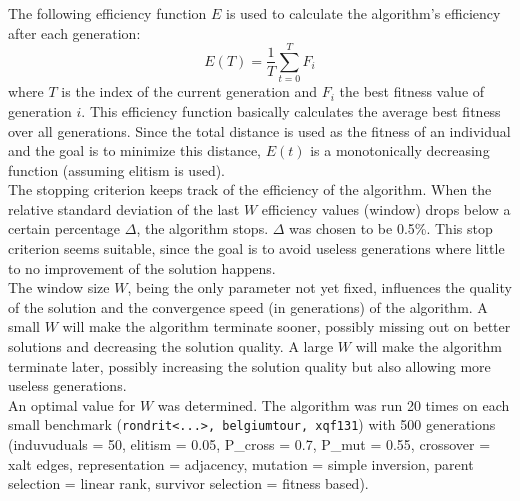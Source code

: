 

The following efficiency function $E$ is used to calculate the algorithm's efficiency after each generation:
\begin{equation}
    E(T) = \frac{1}{T} \sum_{t=0}^T F_i
\end{equation}
where $T$ is the index of the current generation and $F_i$ the best fitness value of generation $i$. This efficiency function basically calculates the average best fitness over all generations. Since the total distance is used as the fitness of an individual and the goal is to minimize this distance, $E(t)$ is a monotonically decreasing function (assuming elitism is used).\\
\newline
The stopping criterion keeps track of the efficiency of the algorithm. When the relative standard deviation of the last $W$ efficiency values (window) drops below a certain percentage $\Delta$, the algorithm stops. $\Delta$ was chosen to be 0.5\%. This stop criterion seems suitable, since the goal is to avoid useless generations where little to no improvement of the solution happens.\\
\newline
The window size $W$, being the only parameter not yet fixed, influences the quality of the solution and the convergence speed (in generations) of the algorithm. A small $W$ will make the algorithm terminate sooner, possibly missing out on better solutions and decreasing the solution quality. A large $W$ will make the algorithm terminate later, possibly increasing the solution quality but also allowing more useless generations.\\
\newline
An optimal value for $W$ was determined. The algorithm was run 20 times on each small benchmark (\texttt{rondrit<...>, belgiumtour, xqf131}) with 500 generations (induvuduals = 50, elitism = 0.05, P\_cross = 0.7, P\_mut = 0.55, crossover = xalt edges, representation = adjacency, mutation = simple inversion, parent selection = linear rank, survivor selection = fitness based). \\

